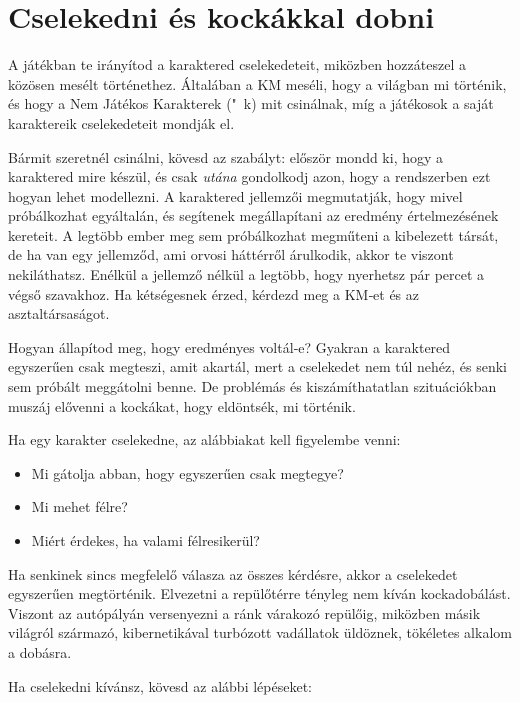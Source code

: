 \chapter{Cselekedni és kockákkal dobni}

A  játékban te irányítod a karaktered cselekedeteit, miközben hozzáteszel a közösen mesélt történethez. Általában a KM meséli, hogy a világban mi történik, és hogy a Nem Játékos Karakterek ("~k) mit csinálnak, míg a játékosok a saját karaktereik cselekedeteit mondják el.

Bármit szeretnél csinálni, kövesd az  szabályt: először mondd ki, hogy a karaktered mire készül, és csak \emph{utána} gondolkodj azon, hogy a rendszerben ezt hogyan lehet modellezni. A karaktered jellemzői megmutatják, hogy mivel próbálkozhat egyáltalán, és segítenek megállapítani az eredmény értelmezésének kereteit. A legtöbb ember meg sem próbálkozhat megműteni a kibelezett társát, de ha van egy jellemződ, ami orvosi háttérről árulkodik, akkor te viszont nekiláthatsz. Enélkül a jellemző nélkül a legtöbb, hogy nyerhetsz pár percet a végső szavakhoz. Ha kétségesnek érzed, kérdezd meg a KM‑et és az asztaltársaságot.

Hogyan állapítod meg, hogy eredményes voltál‑e? Gyakran a karaktered egyszerűen csak megteszi, amit akartál, mert a cselekedet nem túl nehéz, és senki sem próbált meggátolni benne. De problémás és kiszámíthatatlan szituációkban muszáj elővenni a kockákat, hogy eldöntsék, mi történik.

Ha egy karakter cselekedne, az alábbiakat kell figyelembe venni:

\begin{itemize}
    \item Mi gátolja abban, hogy egyszerűen csak megtegye?
    \item Mi mehet félre?
    \item Miért érdekes, ha valami félresikerül?
\end{itemize}

Ha senkinek sincs megfelelő válasza az összes kérdésre, akkor a cselekedet egyszerűen megtörténik. Elvezetni a repülőtérre tényleg nem kíván kockadobálást. Viszont az autópályán versenyezni a ránk várakozó repülőig, miközben másik világról származó, kibernetikával turbózott vadállatok üldöznek, tökéletes alkalom a dobásra.

Ha cselekedni kívánsz, kövesd az alábbi lépéseket:

